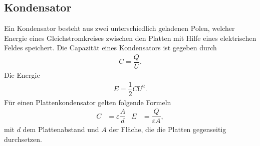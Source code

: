 \subsection{Kondensator}
Ein Kondensator besteht aus zwei unterschiedlich geladenen Polen, welcher Energie eines Gleichstromkreises zwischen den Platten mit Hilfe eines elektrischen Feldes speichert.
Die Capazität eines Kondensators ist gegeben durch
\begin{align} 
        C=\dfrac{Q}{U}
.\end{align} 
Die Energie
\begin{align} 
        E=\dfrac{1}{2}CU^2
.\end{align} 
Für einen Plattenkondensator gelten folgende Formeln
\begin{align} 
        C&=\varepsilon \dfrac{A}{d}&E&=\dfrac{Q}{\varepsilon A}
,\end{align} 
mit $d$ dem Plattenabstand und $A$ der Fläche, die die Platten gegenseitig durchsetzen.
